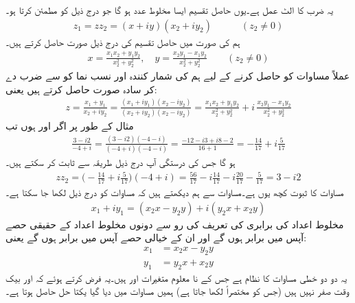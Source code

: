  یہ ضرب کا الٹ عمل ہے۔یوں حاصل تقسیم  ایسا مخلوط عدد  ہو گا جو درج ذیل کو مطمئن کرتا ہو۔
\begin{align}\label{مساوات_مخلوط_عمل_تقسیم}
z_1=zz_2=(x+iy)(x_2+iy_2)\quad \quad \quad (z_2\ne 0)
\end{align} 
ہم  کی صورت میں حاصل تقسیم  کی درج ذیل صورت حاصل کرتے ہیں۔
\begin{align}\label{مساوات_مخلوط_عمل_تقسیم_کلیات_الف}
x=\frac{x_1x_2+y_1y_2}{x_2^2+y_2^2},\quad y=\frac{x_2y_1-x_1y_2}{x_2^2+y_2^2}\quad \quad (z_2\ne 0)
\end{align}
عملاً مساوات  کو حاصل کرنے کے لیے  ہم  کی شمار کنندہ اور نسب نما کو  سے ضرب دے کر سادہ صورت حاصل کرتے ہیں یعنی:
\begin{align}\label{مساوات_مخلوط_عمل_تقسیم_کلیات_ب}
z=\frac{x_1+y_1}{x_2+iy_2}=\frac{(x_1+iy_1)(x_2-iy_2)}{(x_2+iy_2)(x_2-iy_2)}=\frac{x_1x_2+y_1y_2}{x_2^2+y_2^2}+i\,\frac{x_2y_1-x_1y_2}{x_2^2+y_2^2}
\end{align}
مثال کے طور پر اگر  اور  ہوں تب
\begin{align*}
\frac{3-i2}{-4+i}=\frac{(3-i2)(-4-i)}{(-4+i)(-4-i)}=\frac{-12-i3+i8-2}{16+1}=-\frac{14}{17}+i\frac{5}{17}
\end{align*}
ہو گا جس کی درستگی آپ درج ذیل طریقہ سے ثابت کر سکتے ہیں۔
\begin{align*}
zz_2=\big(-\frac{14}{17}+i\frac{5}{17}\big)(-4+i)=\frac{56}{17}-i\frac{14}{17}-i\frac{20}{17}-\frac{5}{17}=3-i2
\end{align*} 
مساوات  کا ثبوت کچھ یوں ہے۔مساوات  سے ہم دیکھتے ہیں کہ مساوات  کو درج ذیل لکھا جا سکتا ہے۔
\begin{align*}
x_1+iy_1=(x_2x-y_2y)+i(y_2x+x_2y)
\end{align*}
مخلوط اعداد کی برابری کی تعریف کی رو سے  دونوں مخلوط اعداد کے حقیقی حصے آپس میں برابر ہوں گے اور ان کے خیالی حصے آپس میں برابر ہوں گے یعنی:
\begin{align*}
x_1&=x_2x-y_2y\\
y_1&=y_2x+x_2y
\end{align*}
یہ دو دو خطی مساوات کا نظام ہے جس کے نا معلوم متغیرات  اور  ہیں۔یہ فرض کرتے ہوئے کہ  اور  بیک وقت صفر نہیں ہیں (جس کو مختصراً  لکھا جاتا ہے) ہمیں مساوات  میں دیا گیا یکتا حل حاصل ہوتا ہے۔

